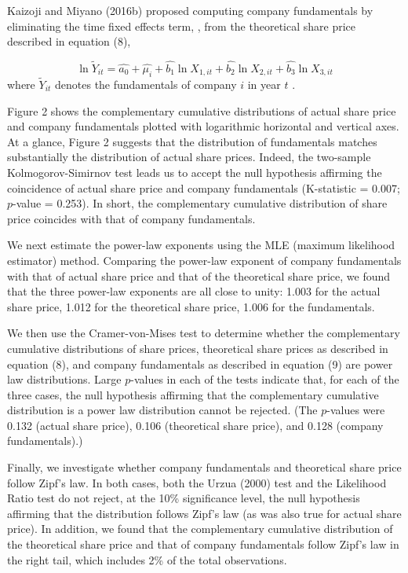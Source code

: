 \documentclass[10pt,a4paper]{article}
\begin{document}
Kaizoji and Miyano (2016b) proposed computing company fundamentals by eliminating the time fixed effects term,  , from the theoretical share price described in equation (8), 

\begin{equation}
\ln \tilde{Y}_{it} = \hat{a_{0}} + \hat{\mu_{i}} + \hat{b_{1}}\ln X_{1,it} + \hat{b_{2}}\ln X_{2,it} + \hat{b_{3} }\ln X_{3,it}
\end{equation} 
where $\tilde{Y}_{it}$  denotes the fundamentals of company $i$   in year $t$  . 

Figure 2 shows the complementary cumulative distributions of actual share price and company fundamentals plotted with logarithmic horizontal and vertical axes. At a glance, Figure 2 suggests that the distribution of fundamentals matches substantially the distribution of actual share prices. Indeed, the two-sample Kolmogorov-Simirnov test leads us to accept the null hypothesis affirming the coincidence of actual share price and company fundamentals (K-statistic = 0.007; $p$-value = 0.253). In short, the complementary cumulative distribution of share price coincides with that of company fundamentals.
 
We next estimate the power-law exponents using the MLE (maximum likelihood estimator) method. Comparing the power-law exponent of company fundamentals with that of actual share price and that of the theoretical share price, we found that the three power-law exponents are all close to unity: 1.003 for the actual share price, 1.012 for the theoretical share price, 1.006 for the fundamentals.

We then use the Cramer-von-Mises test to determine whether the complementary cumulative distributions of share prices, theoretical share prices as described in equation (8), and company fundamentals as described in equation (9) are power law distributions. Large $p$-values in each of the tests indicate that, for each of the three cases, the null hypothesis affirming that the complementary cumulative distribution is a power law distribution cannot be rejected. (The $p$-values were 0.132 (actual share price), 0.106 (theoretical share price), and 0.128 (company fundamentals).) 

Finally, we investigate whether company fundamentals and theoretical share price follow Zipf's law. In both cases, both the Urzua (2000) test and the Likelihood Ratio test do not reject, at the 10\% significance level, the null hypothesis affirming that the distribution follows Zipf's law (as was also true for actual share price). In addition, we found that the complementary cumulative distribution of the theoretical share price and that of company fundamentals follow Zipf's law in the right tail, which includes 2\% of the total observations.
\end{document}
